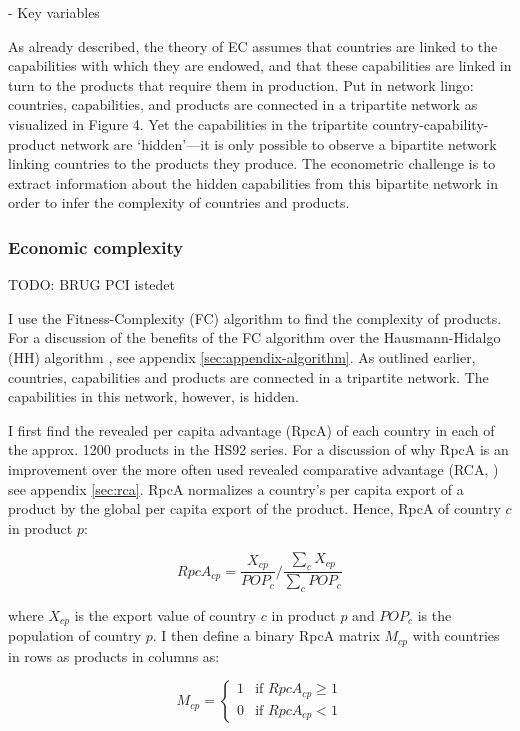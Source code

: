 \documentclass[11pt]{article}
\begin{document}
 - Key variables

As already described, the theory of EC assumes that countries are linked to the capabilities with which they are endowed, and that these capabilities are linked in turn to the products that require them in production. Put in network lingo: countries, capabilities, and products are connected in a tripartite network as visualized in Figure 4. Yet the capabilities in the tripartite country-capability-product network are ‘hidden’—it is only possible to observe a bipartite network linking countries to the products they produce. The econometric challenge is to extract information about the hidden capabilities from this bipartite network in order to infer the complexity of countries and products.


\subsubsection{Economic complexity}%
\label{sub:economic_complexity}

TODO: BRUG PCI istedet


    I use the Fitness-Complexity (FC) algorithm \citep{tacchella_new_2012} to find the complexity of products. For a discussion of the benefits of the FC algorithm over the  Hausmann-Hidalgo (HH) algorithm \citep{hidalgo_building_2009}, see appendix \ref{sec:appendix-algorithm}. As outlined earlier, countries, capabilities and products are connected in a tripartite network. The capabilities in this network, however, is hidden.

I first find the revealed per capita advantage (RpcA) of each country in each of the approx. 1200 products in the HS92 series. For a discussion of why RpcA is an improvement over the more often used revealed comparative advantage (RCA, \citealp{balassa_trade_1965}) see appendix \ref{sec:rca}. RpcA normalizes a country's per capita export of a product by the global per capita export of the product. Hence, RpcA of country \(c\) in product \(p\):

\[
	RpcA_{cp} = \frac{X_{cp}}{POP_{c}} \bigg / \frac{\sum_c X_{cp}}{\sum_c POP_c}
\]

where \(X_{cp}\) is the export value of country \(c\) in product \(p\) and \(POP_{c}\) is the population of country \(p\). I then define a binary RpcA matrix \(M_{cp}\) with countries in rows as products in columns as:

\[
M_{cp} = \begin{cases}
 1 & \text{if } RpcA_{cp} \geq 1 \\
 0 & \text{if } RpcA_{cp} < 1
\end{cases}
\]
\end{document}
